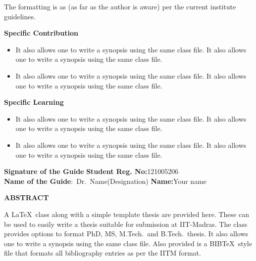\documentclass[a4paper, 12pt, oneside]{sastra}
\begin{document}
	The formatting is as (as far as the author is aware) per the current institute guidelines.
	
	\noindent \textbf{Specific Contribution}
	\begin{itemize}
		\item It also allows one to write a synopsis using the same class file. It also allows one to write a synopsis using the same class file.
		\item It also allows one to write a synopsis using the same class file. It also allows one to write a synopsis using the same class file.
	\end{itemize}
	\noindent \textbf{Specific Learning}
	\begin{itemize}
		\item It also allows one to write a synopsis using the same class file. It also allows one to write a synopsis using the same class file.
		\item It also allows one to write a synopsis using the same class file. It also allows one to write a synopsis using the same class file.
	\end{itemize}
	
	\vspace*{24pt}
	
	\noindent \textbf{Signature of the Guide} \hspace*{70mm} \textbf{Student Reg. No:}121005206\\
	\noindent \textbf{Name of the Guide}:~Dr.~Name(Designation) \hspace*{35mm} \textbf{Name:}Your name
	\pagebreak
	
	\begin{center}
		\Large{{\textbf{ABSTRACT}}}
	\end{center}
	
	
	\vspace*{24pt}
	
	\noindent A \LaTeX\ class along with a simple template thesis are provided here.  These can be used to easily write a thesis suitable for submission at IIT-Madras.  The class provides options to format PhD, MS, M.Tech.\ and B.Tech.\ thesis.  It also allows one to write a synopsis using the same class file.  Also provided is a BIB\TeX\ style file that formats all bibliography entries as per the IITM format.
	
\end{document}
